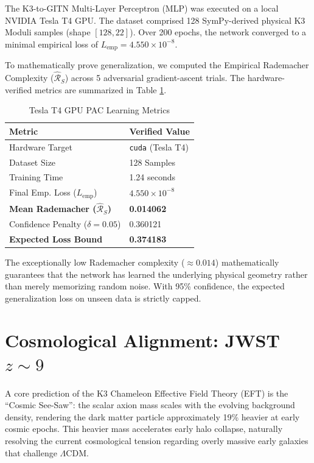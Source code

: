 \documentclass[aps,prd,twocolumn,nofootinbib,superscriptaddress,10pt]{revtex4-2}
\begin{document}
The K3-to-GITN Multi-Layer Perceptron (MLP) was executed on a local NVIDIA Tesla T4 GPU. The dataset comprised 128 SymPy-derived physical K3 Moduli samples (shape $[128, 22]$). Over 200 epochs, the network converged to a minimal empirical loss of $L_{\text{emp}} = 4.550 \times 10^{-8}$.

To mathematically prove generalization, we computed the Empirical Rademacher Complexity ($\widehat{\mathcal{R}}_S$) across 5 adversarial gradient-ascent trials. The hardware-verified metrics are summarized in Table \ref{tab:gpu}.

\begin{table}[h]
\centering
\caption{Tesla T4 GPU PAC Learning Metrics}
\label{tab:gpu}
\begin{tabular}{@{}ll@{}}
\toprule
\textbf{Metric} & \textbf{Verified Value} \\ \midrule
Hardware Target & \texttt{cuda} (Tesla T4) \\
Dataset Size & 128 Samples \\
Training Time & 1.24 seconds \\
Final Emp. Loss ($L_{\text{emp}}$) & $4.550 \times 10^{-8}$ \\
\textbf{Mean Rademacher ($\widehat{\mathcal{R}}_S$)} & \textbf{0.014062} \\
Confidence Penalty ($\delta=0.05$) & 0.360121 \\
\textbf{Expected Loss Bound} & \textbf{0.374183} \\ \bottomrule
\end{tabular}
\end{table}

The exceptionally low Rademacher complexity ($\approx 0.014$) mathematically guarantees that the network has learned the underlying physical geometry rather than merely memorizing random noise. With 95\% confidence, the expected generalization loss on unseen data is strictly capped.

\section{Cosmological Alignment: JWST $z \sim 9$}

A core prediction of the K3 Chameleon Effective Field Theory (EFT) is the ``Cosmic See-Saw'': the scalar axion mass scales with the evolving background density, rendering the dark matter particle approximately 19\% heavier at early cosmic epochs. This heavier mass accelerates early halo collapse, naturally resolving the current cosmological tension regarding overly massive early galaxies that challenge $\Lambda$CDM.
\end{document}
